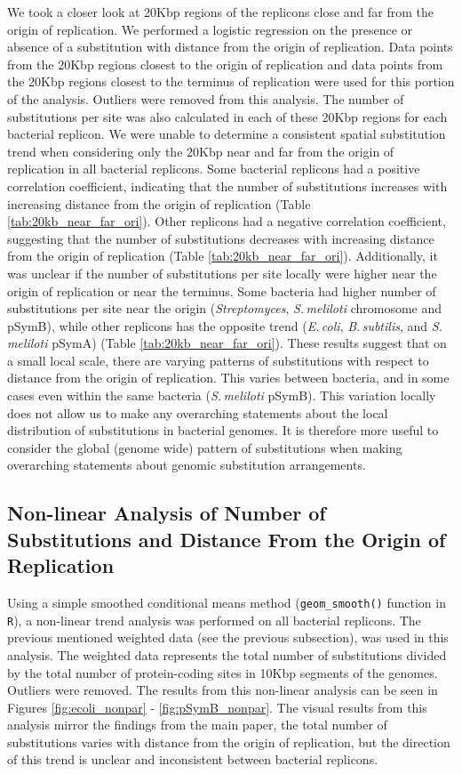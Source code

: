 \documentclass[11pt]{article}
\newcommand{\smel}{\textit{S.\,meliloti}\xspace}
\newcommand{\strep}{\textit{Streptomyces}\xspace}
\newcommand{\ecol}{\textit{E.\,coli}\xspace}
\newcommand{\bass}{\textit{B.\,subtilis}\xspace}
\newcommand{\pa}{pSymA\xspace}
\newcommand{\pb}{pSymB\xspace}
\begin{document}
We took a closer look at 20Kbp regions of the replicons close and far from the origin of replication.
We performed a logistic regression on the presence or absence of a substitution with distance from the origin of replication.
Data points from the 20Kbp regions closest to the origin of replication and data points from the 20Kbp regions closest to the terminus of replication were used for this portion of the analysis.
Outliers were removed from this analysis.
The number of substitutions per site was also calculated in each of these 20Kbp regions for each bacterial replicon.
We were unable to determine a consistent spatial substitution trend when considering only the 20Kbp near and far from the origin of replication in all bacterial replicons.
Some bacterial replicons had a positive correlation coefficient, indicating that the number of substitutions increases with increasing distance from the origin of replication (Table \ref{tab:20kb_near_far_ori}).
Other replicons had a negative correlation coefficient, suggesting that the number of substitutions decreases with increasing distance from the origin of replication (Table \ref{tab:20kb_near_far_ori}).
Additionally, it was unclear if the number of substitutions per site locally were higher near the origin of replication or near the terminus.
Some bacteria had higher number of substitutions per site near the origin (\strep, \smel chromosome and \pb), while other replicons has the opposite trend (\ecol, \bass, and \smel \pa) (Table \ref{tab:20kb_near_far_ori}).
These results suggest that on a small local scale, there are varying patterns of substitutions with respect to distance from the origin of replication.
This varies between bacteria, and in some cases even within the same bacteria (\smel \pb).
This variation locally does not allow us to make any overarching statements about the local distribution of substitutions in bacterial genomes.
It is therefore more useful to consider the global (genome wide) pattern of substitutions when making overarching statements about genomic substitution arrangements.


\subsection{Non-linear Analysis of Number of Substitutions and Distance From the Origin of Replication}

Using a simple smoothed conditional means method (\texttt{geom\_smooth()} function in \texttt{R}), a non-linear trend analysis was performed on all bacterial replicons.
The previous mentioned weighted data (see the previous subsection), was used in this analysis.
The weighted data represents the total number of substitutions divided by the total number of protein-coding sites in 10Kbp segments of the genomes.
Outliers were removed.
The results from this non-linear analysis can be seen in Figures \ref{fig:ecoli_nonpar} - \ref{fig:pSymB_nonpar}.
The visual results from this analysis mirror the findings from the main paper, the total number of substitutions varies with distance from the origin of replication, but the direction of this trend is unclear and inconsistent between bacterial replicons.
 
\end{document}
